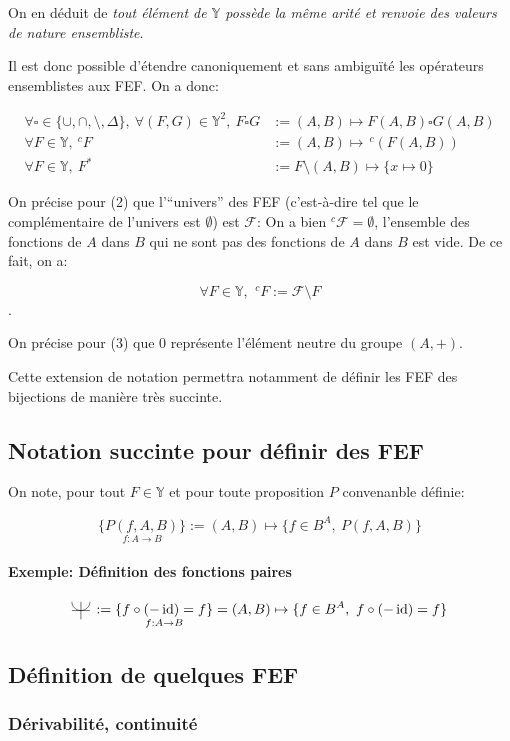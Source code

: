 \documentclass{article}
\newcommand{\Y}{{\mathbb Y}}
\newcommand{\cF}{{\mathcal F}}
\newcommand{\id}{\operatorname{id}}
\newcommand{\evenfunctions}{%
	\begin{tikzpicture}[scale=1.5, baseline=-0.5ex]%
		\draw (-1ex,0) -- (1ex,0);%
		\draw (0,-1ex) -- (0, 1ex);%
		\draw (0ex, 0ex) arc (-90:0:1ex);%
		\draw (0ex, 0ex) arc (90:0:-1ex);%
	\end{tikzpicture}\,%
}
\begin{document}
On en déduit de \emph{tout élément de $\Y$ possède la même arité et renvoie des valeurs de nature ensembliste}.

Il est donc possible d'étendre canoniquement et sans ambiguïté les opérateurs ensemblistes aux FEF.
On a donc:

\begin{align}
	\forall \square \in \{\cup, \cap, \setminus, \Delta \},\ \forall (F, G) \in \Y^2,\ F \square G &:= (A, B)\mapsto F(A, B) \square G(A, B) \\
	\forall F\in \Y,\ ^c\!F &:= (A, B)\mapsto \,^c\!(F(A,B)) \\
	\forall F \in \Y,\ F^\ast &:= F \setminus (A, B)\mapsto \{x\mapsto 0\} 
\end{align}

On précise pour (2) que l'“univers” des FEF (c'est-à-dire tel que le complémentaire de l'univers est $\emptyset$) est $\cF$: On a bien $^c\!\cF = \emptyset$, l'ensemble des fonctions de $A$ dans $B$ qui ne sont pas des fonctions de $A$ dans $B$ est vide. De ce fait, on a:

\[
	\forall F\in \Y,\ \,^c\!F := \cF \setminus F
\]. 

On précise pour (3) que 0 représente l'élément neutre du groupe $(A, +)$.

Cette extension de notation permettra notamment de définir les FEF des bijections de manière très succinte.

\subsection{Notation succinte pour définir des FEF}

On note, pour tout $F \in \Y$ et pour toute proposition $P$ convenanble définie:

\[
	\underset{f:A\to B}{\{P(f, A, B)\}} := (A, B) \mapsto \{f\in B^A,\ P(f, A, B)\} 
\]
\paragraph{Exemple: Définition des fonctions paires}
\[
	\evenfunctions := \underset{f:A\to B}{\{f\circ(-\id) = f \}} = (A, B) \mapsto \{f\in B^A,\ f \circ (-\id) = f \} 
\] 

\subsection{Définition de quelques FEF}

\subsubsection{Dérivabilité, continuité}
\end{document}
